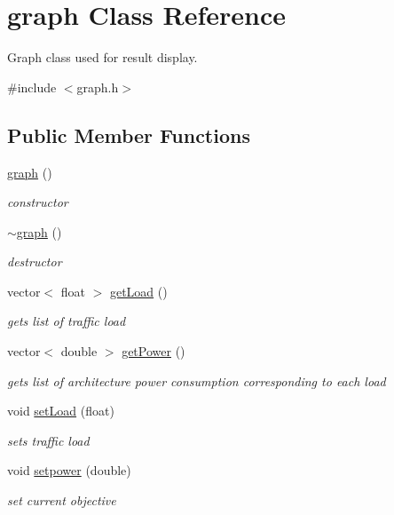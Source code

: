 \hypertarget{classgraph}{
\section{graph Class Reference}
\label{classgraph}
}


Graph class used for result display.  




{\ttfamily \#include $<$graph.h$>$}

\subsection*{Public Member Functions}
\begin{DoxyCompactItemize}
\item 
\hyperlink{classgraph_a6aaa56b4528d2fdb8f0ecd97e04f6651}{graph} ()
\begin{DoxyCompactList}\small\item\em constructor \item\end{DoxyCompactList}\item 
\hyperlink{classgraph_aeb62eaf197cdcb4800fa016eebc3d55a}{$\sim$graph} ()
\begin{DoxyCompactList}\small\item\em destructor \item\end{DoxyCompactList}\item 
vector$<$ float $>$ \hyperlink{classgraph_ae7ba2834c9d12b59ae587db63a130f0c}{getLoad} ()
\begin{DoxyCompactList}\small\item\em gets list of traffic load \item\end{DoxyCompactList}\item 
vector$<$ double $>$ \hyperlink{classgraph_ab863a80f5277b462a7c30af3c2bd005c}{getPower} ()
\begin{DoxyCompactList}\small\item\em gets list of architecture power consumption corresponding to each load \item\end{DoxyCompactList}\item 
void \hyperlink{classgraph_af551af99376a1d3fa4e0181a682aa224}{setLoad} (float)
\begin{DoxyCompactList}\small\item\em sets traffic load \item\end{DoxyCompactList}\item 
void \hyperlink{classgraph_ac78fb63912db679ad11b55dd25021145}{setpower} (double)
\begin{DoxyCompactList}\small\item\em set current objective \item\end{DoxyCompactList}\end{DoxyCompactItemize}


